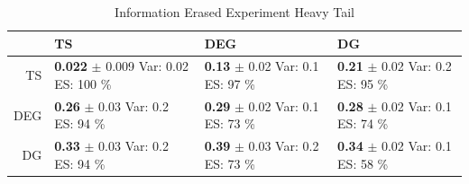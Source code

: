 \documentclass[11pt,letterpaper]{article}
\begin{document}
\begin{table}[H]
\centering
\caption{Information Erased Experiment Heavy Tail} 
\begin{tabular}{rlll}
  \hline
 & TS & DEG &  DG \\ 
  \hline
TS & \makecell{\textbf{ 0.022 } $\pm$ 0.009 \\Var: 0.02 \\ ES: 100 \%} & \makecell{\textbf{ 0.13 } $\pm$ 0.02 \\Var: 0.1 \\ ES: 97 \%} & \makecell{\textbf{ 0.21 } $\pm$ 0.02 \\Var: 0.2 \\ ES: 95 \%} \\ 
  DEG & \makecell{\textbf{ 0.26 } $\pm$ 0.03 \\Var: 0.2 \\ ES: 94 \%} & \makecell{\textbf{ 0.29 } $\pm$ 0.02 \\Var: 0.1 \\ ES: 73 \%} & \makecell{\textbf{ 0.28 } $\pm$ 0.02 \\Var: 0.1 \\ ES: 74 \%} \\ 
   DG & \makecell{\textbf{ 0.33 } $\pm$ 0.03 \\Var: 0.2 \\ ES: 94 \%} & \makecell{\textbf{ 0.39 } $\pm$ 0.03 \\Var: 0.2 \\ ES: 73 \%} & \makecell{\textbf{ 0.34 } $\pm$ 0.02 \\Var: 0.1 \\ ES: 58 \%} \\ 
   \hline
\end{tabular}
\end{table}
\end{document}
